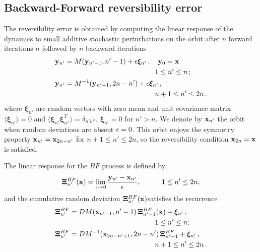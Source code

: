 \subsection{Backward-Forward reversibility error\label{subsection:bf}}
%
The reversibility error is obtained by computing the linear response of the dynamics to small additive stochastic perturbations on the orbit after $n$ forward iterations $n$ followed by $n$ backward iterations 
%
\begin{equation}
 \begin{split}
   &\ybf_{n'}  = M(\ybf_{n'-1},n'-1) +\eps\boldsymbol{\xi}_{n'} \, ,  \quad \ybf_0=\xbf \\
   & \hskip 5 truecm 1\le n'\le n \, ; \\ 
   &\ybf_{n'} = M^{-1}(\ybf_{ n'-1}, 2n-n')+\eps   \boldsymbol{\xi}_{n' } \, , \\
   &   \hskip 5 truecm n+1\le n'\le 2n \, .
  \end{split}
\label{eq2-8}
\end{equation}
%
where $\boldsymbol{\xi}_{n'}$ are random vectors with zero mean and unit covariance matrix $\langle\boldsymbol{\xi}_{n'}\rangle=0$  and $\langle\boldsymbol{\xi}_{n'} \boldsymbol{\xi}_{n''}^T\rangle=\delta_{n' n''}$.
$\boldsymbol{\xi}_{n'}=0$ for $n'>n$. We denote by ${\bf x}_{n'}$ the orbit when random deviations are absent $\epsilon=0$. This orbit
enjoys the symmetry property ${\bf x}_{n'}= {\bf x}_{2n-n'}$ for $n+1\le n'\le 2n$, so the reversibility condition ${\bf x}_{2n}={\bf x}$ is satisfied.

The linear response for the $BF$ process is defined by 
%
\begin{equation}
   \boldsymbol{\Xi}^{BF}_{n'}(\xbf)  = \lim_{\eps\to 0}\frac{\ybf_{n'}-\xbf_{n'}}{ \eps},  \quad \qquad  1\le n'\le 2n,  %
\label{eq2-9}
\end{equation}  
%
and the cumulative random deviation $\boldsymbol{\Xi}^{BF}_{n'}({\bf x})$satisfies the recurrence 
%
\begin{equation}
  \begin{split}
  & \boldsymbol{\Xi}_{n'}^{BF} = DM(\xbf_{n'-1},n'-1)\,\boldsymbol{\Xi}_{n'-1}^{BF}(\xbf)+ \boldsymbol{\xi}_{n'} \, , \\ 
  & \hskip 5 truecm 1\le n'\le n;\\ 
    & \boldsymbol{\Xi}_{n'}^{BF} = DM^{-1}(\xbf_{2n-n' +1},2n-n')\, \boldsymbol{\Xi}_{n'-1}^{BF}    + \boldsymbol{\xi}_{n'} \, , \\
    & \hskip 5 truecm n+1 \le n'\le 2n \, .
  \end{split}
\label{eq2-10}
\end{equation}
%

